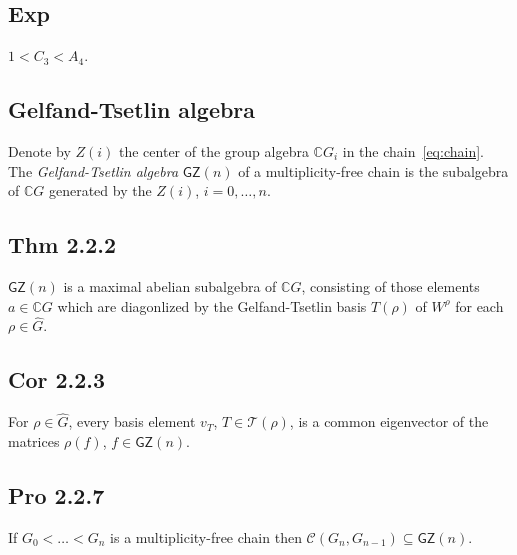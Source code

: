 \documentclass[a4paper]{amsart}
\newcommand{\C}{\mathbb{C}}
\newcommand{\CC}{\mathcal{C}}
\newcommand{\TT}{\mathcal{T}}
\newcommand{\GZ}{\mathsf{GZ}}
\begin{document}
\subsection{Exp} $1 < C_3 < A_4$.

\subsection{Gelfand-Tsetlin algebra}

Denote by $Z(i)$ the center of the group algebra $\C G_i$ in the
chain~\eqref{eq:chain}.  The \emph{Gelfand-Tsetlin algebra} $\GZ(n)$ of a
multiplicity-free chain is the subalgebra of $\C G$ generated by the
$Z(i)$, $i = 0, \dots, n$.

\subsection{Thm 2.2.2}
$\GZ(n)$ is a maximal abelian subalgebra of $\C G$,
consisting of those elements $a \in \C G$ which
are diagonlized by the Gelfand-Tsetlin basis $T(\rho)$ of
$W^{\rho}$ for each $\rho \in \hat{G}$.

\subsection{Cor 2.2.3}
For $\rho \in \hat{G}$, every basis element $v_T$, $T \in \TT(\rho)$,
is a common eigenvector of the matrices $\rho(f)$, $f \in \GZ(n)$.


\subsection{Pro 2.2.7}
If $G_0 < \dots < G_n$ is a multiplicity-free chain then
$\CC(G_n, G_{n-1}) \subseteq \GZ(n)$.
\end{document}
